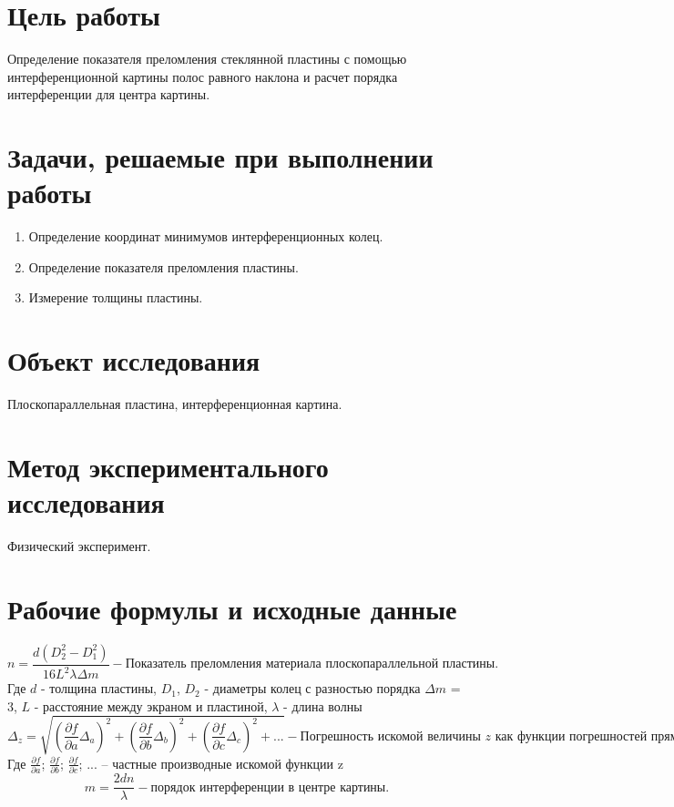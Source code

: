 \documentclass{article}
\begin{document}
\section{Цель работы}
\begin{enumerate}
     Определение показателя преломления стеклянной пластины с помощью интерференционной картины полос равного наклона и расчет порядка интерференции для центра картины.
\end{enumerate}

\section{Задачи, решаемые при выполнении работы}
\begin{enumerate}
    \item Определение координат минимумов интерференционных колец.
    \item Определение показателя преломления пластины.
    \item Измерение толщины пластины.
\end{enumerate}

\section{Объект исследования}
Плоскопараллельная пластина, интерференционная картина.
\section{Метод экспериментального исследования}
Физический эксперимент.
\section{Рабочие формулы и исходные данные}
\begin{equation}
 n = \frac{d(D^{2}_{2}-D^{2}_{1})}{16L^{2}\lambda \Delta m} - \textit{Показатель преломления материала плоскопараллельной пластины.}
 \label{eq:ref1}
\end{equation}
Где $d$ - толщина пластины, $D_{1}$, $D_{2}$ - диаметры колец с разностью порядка $\Delta m$ = 3, $L$ - расстояние между экраном и пластиной, $\lambda$ - длина волны
\begin{equation}
 \Delta_{z}=\sqrt{(\frac{\partial f}{\partial a}\Delta_{a})^2 + (\frac{\partial f}{\partial b}\Delta_{b})^2 + (\frac{\partial f}{\partial c}\Delta_{c})^2 + ...} - \textit{Погрешность искомой величины z как функции погрешностей прямо измеренных величин.}
 \label{eq:ref2}
\end{equation}
Где $\frac{\partial f}{\partial a}$; $\frac{\partial f}{\partial b}$; $\frac{\partial f}{\partial c}$; ... – частные производные искомой функции z
\begin{equation}
 m = \frac{2dn}{\lambda} - \textit{порядок интерференции в центре картины.}
 \label{eq:ref3}
\end{equation}
\newpage
\end{document}
